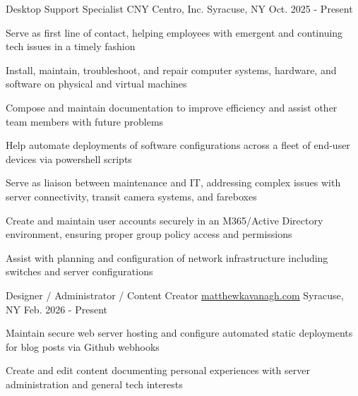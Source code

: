 


\begin{cventries}


\cventry
{Desktop Support Specialist} %
{CNY Centro, Inc.} %
{Syracuse, NY} %
{Oct. 2025 - Present} %
{ %
\begin{cvitems}
  \item {Serve as first line of contact, helping employees with emergent and continuing tech issues in a timely fashion}
  \item {Install, maintain, troubleshoot, and repair computer systems, hardware, and software on physical and virtual machines}
  \item {Compose and maintain documentation to improve efficiency and assist other team members with future problems}
  \item {Help automate deployments of software configurations across a fleet of end-user devices via powershell scripts}
  \item {Serve as liaison between maintenance and IT, addressing complex issues with server connectivity, transit camera systems, and fareboxes}
  \item {Create and maintain user accounts securely in an M365/Active Directory environment, ensuring proper group policy access and permissions}
  \item {Assist with planning and configuration of network infrastructure including switches and server configurations}
\end{cvitems}
}

\vspace{4mm}

\cventry
{Designer / Administrator / Content Creator} %
{\href{https://matthewkavanagh.com}{matthewkavanagh.com}} %
{Syracuse, NY} %
{Feb. 2026 - Present} %
{ %
\begin{cvitems}
  \item {Maintain secure web server hosting and configure automated static deployments for blog posts via Github webhooks}
  \item {Create and edit content documenting personal experiences with server administration and general tech interests}
\end{cvitems}
}


\end{cventries}
